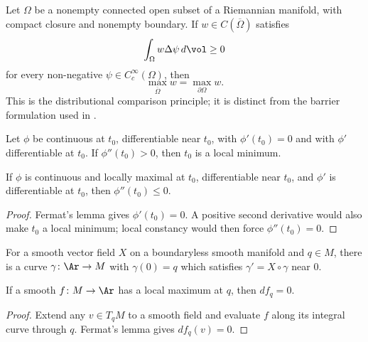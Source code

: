 \begin{claim}
\label{claim:weak-subsolution-comparison}

Let $\Omega$ be a nonempty connected open subset of a Riemannian
manifold, with compact closure and nonempty boundary. If
$w\in C(\overline\Omega)$ satisfies
$$\int_\Omega w\Delta\psi\,d\vol\ge0$$
for every non-negative $\psi\in C_c^\infty(\Omega)$, then
$$\max_{\overline\Omega}w=\max_{\partial\Omega}w.$$
This is the distributional comparison principle; it is distinct from
the barrier formulation used in \cite{Petersen}.
\end{claim}

\begin{lemma}
\label{lem:second-derivative-test-min}
\mathlibok
Let $\phi$ be continuous at $t_0$, differentiable near $t_0$, with
$\phi'(t_0)=0$ and with $\phi'$ differentiable at $t_0$. If
$\phi''(t_0)>0$, then $t_0$ is a local minimum.
\end{lemma}

\begin{lemma}
\label{lem:second-derivative-test-max}
\leanok


If $\phi$ is continuous and locally maximal at $t_0$, differentiable
near $t_0$, and $\phi'$ is differentiable at $t_0$, then
$\phi''(t_0)\le0$.
\end{lemma}
\begin{proof}
\sketch
\leanok
{}
Fermat's lemma gives $\phi'(t_0)=0$. A positive second derivative would
also make $t_0$ a local minimum; local constancy would then force
$\phi''(t_0)=0$.
\end{proof}

\begin{lemma}
\label{lem:integral-curve-exists}
\mathlibok
For a smooth vector field $X$ on a boundaryless smooth manifold and
$q\in M$, there is a curve $\gamma\colon\Ar\to M$ with $\gamma(0)=q$
which satisfies $\gamma'=X\circ\gamma$ near $0$.
\end{lemma}

\begin{lemma}
\label{lem:differential-vanishes-at-max}


If a smooth $f\colon M\to\Ar$ has a local maximum at $q$, then
$df_q=0$.
\end{lemma}
\begin{proof}
\sketch
\leanok
{}
Extend any $v\in T_qM$ to a smooth field and evaluate $f$ along its
integral curve through $q$. Fermat's lemma gives $df_q(v)=0$.
\end{proof}

